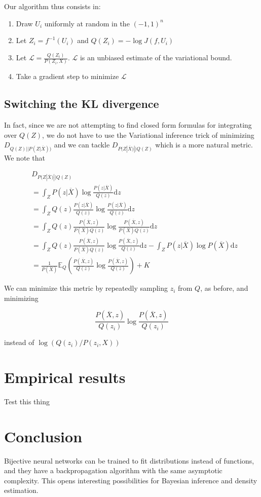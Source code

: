 \documentclass{article}
\begin{document}
Our algorithm thus consists in:

\begin{enumerate}
\item Draw \(U_i\) uniformly at random in the \((-1,1)^n\)
\item Let \(Z_i = f^{-1}(U_i)\) and \(Q(Z_i) = -\log J(f, U_i)\)
\item Let \(\mathcal{L} = \frac{Q(Z_i)}{P(Z_i, X)}\). \(\mathcal{L}\) is an
  unbiased estimate of the variational bound.
\item Take a gradient step to minimize \(\mathcal{L}\)
\end{enumerate}

\subsection{Switching the KL divergence}

In fact, since we are not attempting to find closed form formulas for
integrating over \(Q(Z)\), we do not have to use the Variational inference
trick of minimizing \(D_{Q(Z)||P(Z|\overline{X}))}\) and we can tackle
\(D_{P(Z|\overline{X})||Q(Z)}\) which is a more natural metric. We note that

\[
\begin{aligned}
  & D_{P(Z|\overline{X})|| Q(Z)} \\
  &= \int_Z P(z|\overline{X}) \log \frac{P(z|\overline{X})}{Q(z)} \mathrm{d}z \\
  &= \int_Z Q(z) \frac{P(z|\overline{X})}{Q(z)} \log \frac{P(z|\overline{X})}{Q(z)}  \mathrm{d}z \\
  &= \int_Z Q(z) \frac{P(\overline{X}, z)}{P(\overline{X})Q(z)} \log \frac{P(\overline{X}, z)}{P(\overline{X})Q(z)}  \mathrm{d}z \\
  &= \int_Z Q(z) \frac{P(\overline{X}, z)}{P(\overline{X})Q(z)} \log \frac{P(\overline{X}, z)}{Q(z)}  \mathrm{d}z
  - \int_Z P(z|\overline{X}) \log P(\overline{X})  \mathrm{d}z \\
  &= \frac{1}{P(\overline{X})}\mathbb{E}_{Q} \left( \frac{P(\overline{X}, z)}{Q(z)} \log \frac{P(\overline{X}, z)}{Q(z)}\right) + K
\end{aligned}
\]

We can minimize this metric by repeatedly sampling \(z_i\) from \(Q\),
as before, and minimizing

\[
  \frac{P(\overline{X}, z)}{Q(z_i)} \log \frac{P(\overline{X}, z)}{Q(z_i)}
\]

instead of \(\log(Q(z_i)/P(z_i, X))\)


\section{Empirical results}

Test this thing


\section{Conclusion}

Bijective neural networks can be trained to fit distributions instead of
functions, and they have a backpropagation algorithm with the same asymptotic
complexity. This opens interesting possibilities for Bayesian inference and
density estimation.
\end{document}
